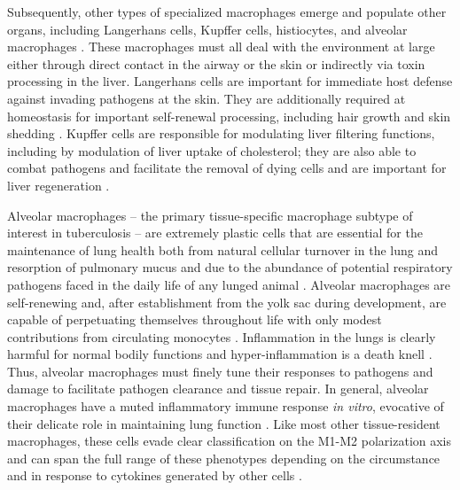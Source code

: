 Subsequently, other types of specialized macrophages emerge and populate other organs, including Langerhans cells, Kupffer cells, histiocytes, and alveolar macrophages \citep{Gordon2017, Davies2013a}. These macrophages must all deal with the environment at large either through direct contact in the airway or the skin or indirectly via toxin processing in the liver. Langerhans cells are important for immediate host defense against invading pathogens at the skin. They are additionally required at homeostasis for important self\hyp{}renewal processing, including hair growth and skin shedding \citep{Merad2008, Theret2019}. Kupffer cells are responsible for modulating liver filtering functions, including by modulation of liver uptake of cholesterol; they are also able to combat pathogens and facilitate the removal of dying cells and are important for liver regeneration \citep{Demetz2020, Theret2019}. 

Alveolar macrophages -- the primary tissue\hyp{}specific macrophage subtype of interest in tuberculosis -- are extremely plastic cells that are essential for the maintenance of lung health both from natural cellular turnover in the lung and resorption of pulmonary mucus and due to the abundance of potential respiratory pathogens faced in the daily life of any lunged animal \citep{Hussell2014}. Alveolar macrophages are self\hyp{}renewing and, after establishment from the yolk sac during development, are capable of perpetuating themselves throughout life with only modest contributions from circulating monocytes \citep{Hashimoto2013, Yona2013, Varol2015}. Inflammation in the lungs is clearly harmful for normal bodily functions and hyper\hyp{}inflammation is a death knell \citep{Kemp2002}. Thus, alveolar macrophages must finely tune their responses to pathogens and damage to facilitate pathogen clearance and tissue repair. In general, alveolar macrophages have a muted inflammatory immune response \textit{in vitro}, evocative of their delicate role in maintaining lung function \citep{Svedberg2019, Joshi2018}. Like most other tissue\hyp{}resident macrophages, these cells evade clear classification on the M1\hyp{}M2 polarization axis and can span the full range of these phenotypes depending on the circumstance and in response to cytokines generated by other cells \citep{Svedberg2019, Hussell2014}. 

